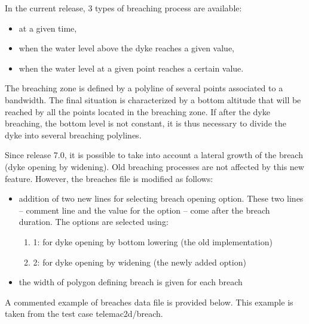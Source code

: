  In the current release, 3 types of breaching process are available:

\begin{itemize}
\item  at a given time,

\item  when the water level above the dyke reaches a given value,

\item  when the water level at a given point reaches a certain value.
\end{itemize}

 The breaching zone is defined by a polyline of several points associated to a bandwidth. The final situation is characterized by a bottom altitude that will be reached by all the points located in the breaching zone. If after the dyke breaching, the bottom level is not constant, it is thus necessary to divide the dyke into several breaching polylines.

 Since release 7.0, it is possible to take into account a lateral growth of the breach (dyke opening by widening). Old breaching processes are not affected by this new feature. However, the breaches file is modified as follows:

\begin{itemize}
\item  addition of two new lines for selecting breach opening option. These two lines -- comment line and the value for the option -- come after the breach duration. The options are selected using:
\begin{enumerate}
\item [\nonumber] 1: for dyke opening by bottom lowering (the old implementation)

\item [\nonumber] 2: for dyke opening by widening (the newly added option)

\end{enumerate}
\item  the width of polygon defining breach is given for each breach
\end{itemize}

 A commented example of breaches data file is provided below. This example is taken from the test case telemac2d/breach.

